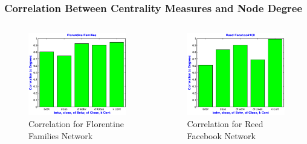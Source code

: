 \documentclass{beamer}
\begin{document}
\begin{frame}
\frametitle{Correlation Between Centrality Measures and Node Degree}
\begin{columns}[T]
\begin{column}{.5\textwidth}
\begin{figure}[h]
\begin{center}
\includegraphics[width=0.76\columnwidth]{correlation_Florentine}
\end{center}
\caption{Correlation for Florentine Families Network}
\label{fig:Correlation  - Florentine}
\end{figure}
\end{column}
\begin{column}{.5\textwidth}
\begin{figure}[h]
\begin{center}
\includegraphics[width=0.76\columnwidth]{correlation_Reed}
\end{center}
\caption{Correlation for Reed Facebook Network}
\label{fig:Correlation - Reed}
\end{figure}
\end{column}
\end{columns}
\end{frame}
\end{document}
